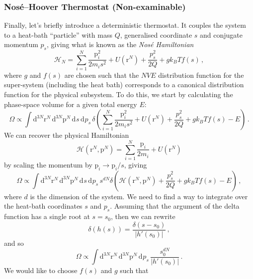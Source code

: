 \documentclass{article}
\theoremstyle{plain}\theoremheaderfont{\normalfont\itshape}\theorembodyfont{\rmfamily}\theoremseparator{.}\newtheorem*{rem}{Remark}\newtheorem*{ex}{Example}\newtheorem*{proof}{Proof}\newtheorem*{altp}{Alternative proof}
\theoremstyle{plain}\theoremheaderfont{\normalfont\bfseries}\theorembodyfont{\rmfamily}\theoremseparator{.}\newtheorem{thm}{Theorem}[section]\newtheorem{lem}[thm]{Lemma}\newtheorem{prop}[thm]{Proposition}\newtheorem*{cor}{Corollary}\newtheorem{defn}[thm]{Definition}\newtheorem{clm}[thm]{Claim}\newtheorem{clminproof}{Claim}\newtheorem{alg}[thm]{Algorithm}\newtheorem{hyp}[thm]{Hypothesis}\newtheorem{law}[thm]{Law}
\theoremstyle{break}\theoremheaderfont{\normalfont\itshape}\theorembodyfont{\rmfamily}\theoremseparator{.\medskip}\newtheorem*{proofskip}{Proof}\newtheorem*{exs}{Examples}\newtheorem*{rems}{Remarks}
\theoremstyle{break}\theoremheaderfont{\normalfont\bfseries}\theorembodyfont{\rmfamily}\theoremseparator{.\medskip}\newtheorem{lemskip}[thm]{Lemma}\newtheorem{defnskip}[thm]{Definition}\newtheorem{propskip}[thm]{Proposition}\newtheorem{thmskip}[thm]{Theorem}
\numberwithin{equation}{section}
\newcommand{\dd}[2][]{\mathrm{d}^{#1} #2\,}
\newcommand{\vb}[1]{\bm{\mathrm{#1}}}
\newcommand{\abs}[1]{\left| #1 \right|}
\begin{document}
    \subsubsection*{Nos\'{e}--Hoover Thermostat (Non-examinable)}
    Finally, let's briefly introduce a deterministic thermostat. It couples the system to a heat-bath ``particle'' with mass \(Q\), generalised coordinate \(s\) and conjugate momentum \(p_s\), giving what is known as the \textit{Nos\'{e} Hamiltonian}
    \begin{equation}
        \mathcal{H}_N=\sum_{i=1}^{N}\frac{\vb{p}_i^2}{2m_i s^2}+U(\vb{r}^N)+\frac{p_s^2}{2Q}+gk_B Tf(s)\,,
    \end{equation}
    where \(g\) and \(f(s)\) are chosen such that the \(NVE\) distribution function for the super-system (including the heat bath) corresponds to a canonical distribution function for the physical subsystem. To do this, we start by calculating the phase-space volume for a given total energy \(E\):
    \begin{equation}
        \Omega\propto\int\dd[3N]{\vb{r}^N}\dd[3N]{\vb{p}^N}\dd{s}\dd{p_s}\delta\left(\sum_{i=1}^{N}\frac{\vb{p}_i^2}{2m_i s^2}+U(\vb{r}^N)+\frac{p_s^2}{2Q}+gk_B Tf(s)-E\right)\,.
    \end{equation}
    We can recover the physical Hamiltonian
    \begin{equation}
        \mathcal{H}(\vb{r}^N,\vb{p}^N)=\sum_{i=1}^{N}\frac{\vb{p}_i}{2m_i}+U(\vb{r}^N)
    \end{equation}
    by scaling the momentum by \(\vb{p}_i\to\vb{p}_i/s\), giving
    \begin{equation}
        \Omega\propto\int\dd[3N]{\vb{r}^N}\dd[3N]{\vb{p}^N}\dd{s}\dd{p_s}s^{dN}\delta\left(\mathcal{H}(\vb{r}^N,\vb{p}^N)+\frac{p_s^2}{2Q}+gk_B Tf(s)-E\right)\,,
    \end{equation}
    where \(d\) is the dimension of the system. We need to find a way to integrate over the heat-bath coordinates \(s\) and \(p_s\). Assuming that the argument of the delta function has a single root at \(s=s_0\), then we can rewrite
    \begin{equation}
        \delta(h(s))=\frac{\delta(s-s_0)}{\abs{h'(s_0)}}\,,
    \end{equation}
    and so
    \begin{equation}
        \Omega\propto\int\dd[3N]{\vb{r}^N}\dd[3N]{\vb{p}^N}\dd{p_s}\frac{s_0^{dN}}{\abs{h'(s_0)}}\,.
    \end{equation}
    We would like to choose \(f(s)\) and \(g\) such that
\end{document}
